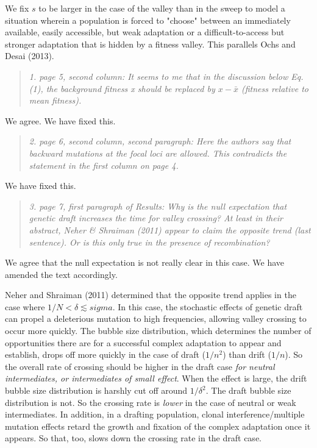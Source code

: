 \documentclass[11pt]{article}
\newenvironment{reviewerquote}{\begin{quote}\color{black}\itshape}{\end{quote}}
\begin{document}
We fix $s$ to be larger in the case of the valley than in the sweep to model a situation wherein a population is forced to "choose" between an immediately available, easily accessible, but weak adaptation or a difficult-to-access but stronger adaptation that is hidden by a fitness valley. This parallels Ochs and Desai (2013).

\begin{reviewerquote}
1. page 5, second column: It seems to me that in the discussion below Eq.(1), the background fitness x should be replaced by $x - \bar{x}$ (fitness relative to mean fitness). 
\end{reviewerquote}

We agree. We have fixed this.

\begin{reviewerquote}
2. page 6, second column, second paragraph: Here the authors say that backward mutations at the focal loci are allowed. This contradicts the statement in the first column on page 4.
\end{reviewerquote}

We have fixed this.

\begin{reviewerquote}
3. page 7, first paragraph of Results: Why is the null expectation that genetic draft increases the time for valley crossing? At least in their abstract, Neher \& Shraiman (2011) appear to claim the opposite trend (last sentence). Or is this only true in the presence of recombination?
\end{reviewerquote}

We agree that the null expectation is not really clear in this case. We have amended the text accordingly.

Neher and Shraiman (2011) determined that the opposite trend applies in the case where $1/N < \delta \lesssim sigma$. In this case, the stochastic effects of genetic draft can propel a deleterious mutation to high frequencies, allowing valley crossing to occur more quickly. The bubble size distribution, which determines the number of opportunities there are for a successful complex adaptation to appear and establish, drops off more quickly in the case of draft ($1/n^2$) than drift ($1/n$). So the overall rate of crossing should be higher in the draft case \emph{for neutral intermediates, or intermediates of small effect}. When the effect is large, the drift bubble size distribution is harshly cut off around $1/\delta^2$. The draft bubble size distribution is not. So the crossing rate is \emph{lower} in the case of neutral or weak intermediates. In addition, in a drafting population, clonal interference/multiple mutation effects retard the growth and fixation of the complex adaptation once it appears. So that, too, slows down the crossing rate in the draft case.
\end{document}
